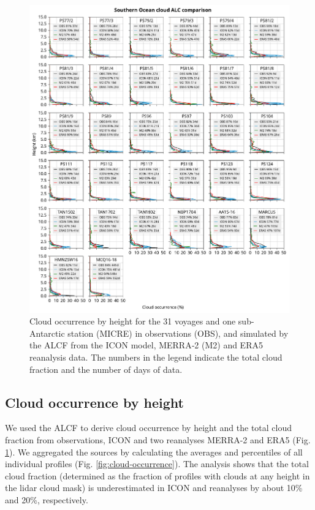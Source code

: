 \documentclass[12pt,a4paper]{article}
\begin{document}
\begin{figure}
\centerline{
\includegraphics[width=1.06\textwidth]{img/cloud_occurrence_panel.pdf}
}
\caption{Cloud occurrence by height for the 31 voyages and one sub-Antarctic
station (MICRE) in observations (OBS), and simulated by the ALCF from the
ICON model, MERRA‐2 (M2) and ERA5 reanalysis data. The numbers in the legend
indicate the total cloud fraction and the number of days of data.}
\label{fig:cloud-occurrence-panel}
\end{figure}

\subsection{Cloud occurrence by height}

We used the ALCF to derive cloud occurrence by height and the total cloud
fraction from observations, ICON and two reanalyses MERRA-2 and ERA5 (Fig.
\ref{fig:cloud-occurrence-panel}). We aggregated the sources by calculating
the averages and percentiles of all individual profiles (Fig.
\ref{fig:cloud-occurrence}). The analysis shows that the total cloud fraction
(determined as the fraction of proﬁles with clouds at any height in the lidar
cloud mask) is underestimated in ICON and reanalyses by about 10\% and 20\%,
respectively.
\end{document}
